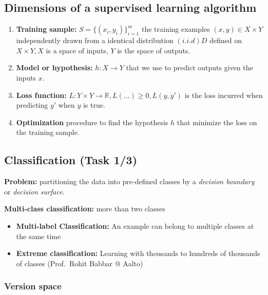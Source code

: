\documentclass[12pt]{article}
\begin{document}
\subsection{Dimensions of a supervised learning algorithm
}\label{dimensions-of-a-supervised-learning-algorithm}

\begin{enumerate}
\def\labelenumi{\arabic{enumi}.}
\item
  \textbf{Training sample:} $S = \{(x_i, y_i)\}^m_{i=1}$ the training
  examples $(x, y) \in X \times Y$ independently drawn from a identical
  distribution $(i.i.d) D$ defined on $X \times Y, X$ is a space of inputs,
  $Y$ is the space of outputs.
\item
  \textbf{Model or hypothesis:} $h : X \rightarrow Y$ that we use to predict
  outputs given the inputs $x$.
\item
  \textbf{Loss function:} $L : Y \times Y \rightarrow \mathbb{R}, L(...) \geq 0, L(y, y')$ is the
  loss incurred when predicting $y'$ when $y$ is true.
\item
  \textbf{Optimization} procedure to find the hypothesis $h$ that
  minimize the loss on the training sample.
\end{enumerate}



\subsection{Classification (Task 1/3)}

\textbf{Problem:} partitioning the data into pre-defined classes by a
\emph{decision boundary} or \emph{decision surface}.

\textbf{Multi-class classification:} more than two classes

\begin{itemize}
  \item
    \textbf{Multi-label Classification:} An example can belong to multiple classes at the same time
  \item
    \textbf{Extreme classification:} Learning with thousands to
    hundreds of thousands of classes (Prof.~Rohit Babbar @ Aalto)
\end{itemize}



\subsubsection{Version space}\label{version-space}
\end{document}
